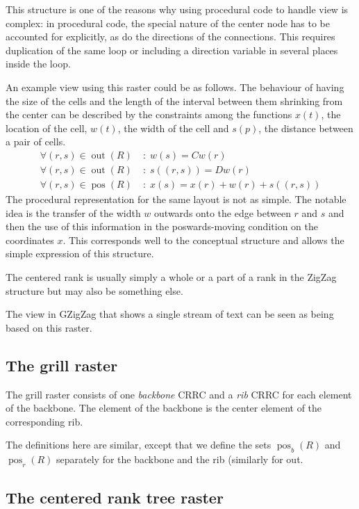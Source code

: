 \documentclass[a4paper]{article}
\newcommand{\marginaali}[1]{\marginpar{#1}}
\newcommand{\marginaali}[1]{}
\newcommand{\nakki}[1]{\marginaali{\textbf{\small Nakki: #1}}}
\DeclareMathOperator{\pos}{pos}
\DeclareMathOperator{\out}{out}
\begin{document}
This structure is one of the reasons why using procedural code
to handle view is complex: in procedural code, the special
nature of the center node has to be accounted for explicitly,
as do the directions of the connections. This requires
duplication of the same loop or including a direction variable
in several places inside the loop.

An example view using this raster could be as follows.
The behaviour of having the size of the cells and the length
of the interval between them shrinking from the center
can be described by the constraints among the functions
$x(t)$, the location of the cell, $w(t)$, the width of the cell
and $s(p)$, the distance between a pair of cells.
\begin{align}
        \forall (r, s) \in \out(R) \;&:\;
                w(s) = C w(r) \\
        \forall (r, s) \in \out(R) \;&:\;
                s((r, s)) = D w(r) \\
        \forall (r, s) \in \pos(R) \;&:\;
                x(s) = x(r) + w(r) + s((r, s)) 
\end{align}
The procedural representation for the same layout is not as simple.
The notable idea is the transfer of the width $w$ outwards onto
the edge between $r$ and $s$ and then the use of this information
in the poswards-moving condition on the coordinates $x$.
This corresponds well to the 
conceptual structure and allows the simple expression of this structure.

The centered rank is usually simply a whole or a part of a rank
in the ZigZag structure but may also be something else.

The view in GZigZag that shows a single stream of text can be
seen as being based on this raster.

\subsection{The grill raster}

The grill raster consists of one \emph{backbone} CRRC and a 
\emph{rib}
CRRC for each element of the backbone. The element of the backbone
is the center element of the corresponding rib.
\nakki{Parempi nimi?}

The definitions here are similar, except that we define 
the sets
$\pos_b(R)$  and
$\pos_r(R)$ separately for the backbone and the rib (similarly
for out.


\subsection{The centered rank tree raster}
\end{document}
